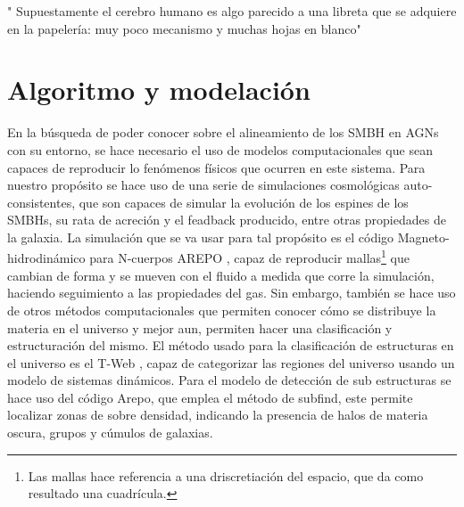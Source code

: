 \begin{savequote}[50mm]
"
Supuestamente el cerebro humano es algo parecido a una libreta que se adquiere en la papelería: muy poco mecanismo y muchas hojas en blanco"
\end{savequote}

\chapter{Algoritmo y modelación}
\label{cha: Algoritmo y modelacion}

En la búsqueda de poder conocer sobre el alineamiento de los SMBH en AGNs con su entorno, se hace necesario el uso de modelos computacionales que sean capaces de reproducir lo fenómenos físicos que ocurren en este sistema. Para nuestro propósito se hace uso de una serie de simulaciones cosmológicas auto-consistentes, que son capaces de simular la evolución de los espines de los SMBHs, su rata de acreción y el feadback producido,  entre otras propiedades de la galaxia. La simulación que se va usar para tal propósito es el código Magneto-hidrodinámico para N-cuerpos AREPO \cite{springel2010}, capaz de reproducir mallas\footnote{Las mallas hace referencia a una driscretiación del espacio, que da como resultado una cuadrícula.} que cambian de forma y se mueven con el fluido a medida que corre la simulación,  haciendo seguimiento a las propiedades del gas. Sin embargo, también se hace uso de otros métodos computacionales que permiten conocer cómo se distribuye la materia en el universo y mejor aun, permiten hacer una clasificación y estructuración del mismo. El método usado para la clasificación de estructuras en el universo es el  T-Web \cite{hahn2007}, capaz de categorizar las regiones del universo usando un modelo de sistemas dinámicos. Para el modelo de detección de sub estructuras se hace uso del código Arepo, que emplea el método de subfind, este permite localizar zonas de sobre densidad, indicando la presencia de halos de materia oscura, grupos y cúmulos de galaxias. 

